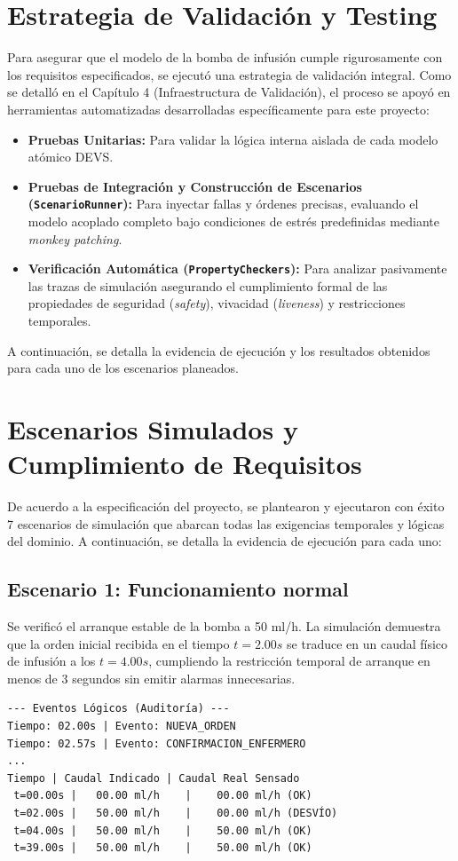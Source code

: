 \section{Estrategia de Validación y Testing}

Para asegurar que el modelo de la bomba de infusión cumple rigurosamente con los requisitos especificados, se ejecutó una estrategia de validación integral. Como se detalló en el Capítulo 4 (Infraestructura de Validación), el proceso se apoyó en herramientas automatizadas desarrolladas específicamente para este proyecto:
\begin{itemize}
    \item \textbf{Pruebas Unitarias:} Para validar la lógica interna aislada de cada modelo atómico DEVS.
    \item \textbf{Pruebas de Integración y Construcción de Escenarios (\texttt{ScenarioRunner}):} Para inyectar fallas y órdenes precisas, evaluando el modelo acoplado completo bajo condiciones de estrés predefinidas mediante \textit{monkey patching}.
    \item \textbf{Verificación Automática (\texttt{PropertyCheckers}):} Para analizar pasivamente las trazas de simulación asegurando el cumplimiento formal de las propiedades de seguridad (\textit{safety}), vivacidad (\textit{liveness}) y restricciones temporales.
\end{itemize}

A continuación, se detalla la evidencia de ejecución y los resultados obtenidos para cada uno de los escenarios planeados.

\section{Escenarios Simulados y Cumplimiento de Requisitos}

De acuerdo a la especificación del proyecto, se plantearon y ejecutaron con éxito 7 escenarios de simulación que abarcan todas las exigencias temporales y lógicas del dominio. A continuación, se detalla la evidencia de ejecución para cada uno:

\subsection{Escenario 1: Funcionamiento normal}
Se verificó el arranque estable de la bomba a 50 ml/h. La simulación demuestra que la orden inicial recibida en el tiempo $t=2.00s$ se traduce en un caudal físico de infusión a los $t=4.00s$, cumpliendo la restricción temporal de arranque en menos de 3 segundos sin emitir alarmas innecesarias.
\begin{verbatim}
--- Eventos Lógicos (Auditoría) ---
Tiempo: 02.00s | Evento: NUEVA_ORDEN
Tiempo: 02.57s | Evento: CONFIRMACION_ENFERMERO
...
Tiempo | Caudal Indicado | Caudal Real Sensado
 t=00.00s |   00.00 ml/h    |    00.00 ml/h (OK)
 t=02.00s |   50.00 ml/h    |    00.00 ml/h (DESVÍO)
 t=04.00s |   50.00 ml/h    |    50.00 ml/h (OK)
 t=39.00s |   50.00 ml/h    |    50.00 ml/h (OK)
\end{verbatim}

